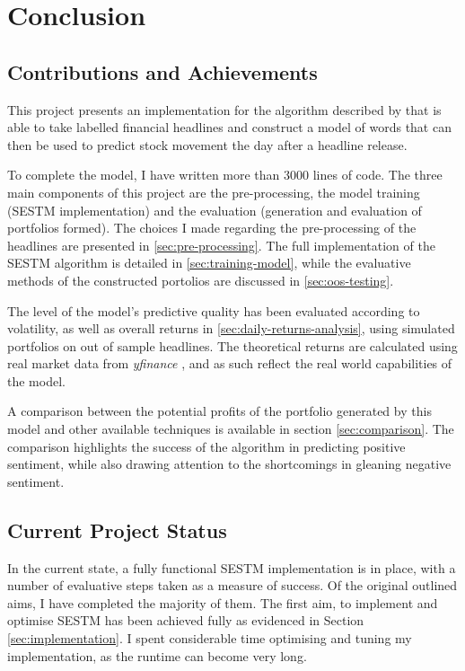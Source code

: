 \chapter{Conclusion}
\label{chap:conclusion}

\section{Contributions and Achievements}
This project presents an implementation for the algorithm described by \textcite{sestm} that is able to take labelled financial headlines and construct a model of words that can then be used to predict stock movement the day after a headline release.

To complete the model, I have written more than 3000 lines of code. The three main components of this project are the pre-processing, the model training (SESTM implementation) and the evaluation (generation and evaluation of portfolios formed). The choices I made regarding the pre-processing of the headlines are presented in \ref{sec:pre-processing}. The full implementation of the SESTM algorithm is detailed in \ref{sec:training-model}, while the evaluative methods of the constructed portolios are discussed in \ref{sec:oos-testing}.

The level of the model's predictive quality has been evaluated according to volatility, as well as overall returns in \ref{sec:daily-returns-analysis}, using simulated portfolios on out of sample headlines. The theoretical returns are calculated using real market data from \textit{yfinance} \parencite{yfinance}, and as such reflect the real world capabilities of the model.

A comparison between the potential profits of the portfolio generated by this model and other available techniques is available in section \ref{sec:comparison}. The comparison highlights the success of the algorithm in predicting positive sentiment, while also drawing attention to the shortcomings in gleaning negative sentiment.

\section{Current Project Status}
In the current state, a fully functional SESTM implementation is in place, with a number of evaluative steps taken as a measure of success. Of the original outlined aims, I have completed the majority of them. The first aim, to implement and optimise SESTM has been achieved fully as evidenced in Section \ref{sec:implementation}. I spent considerable time optimising and tuning my implementation, as the runtime can become very long.

